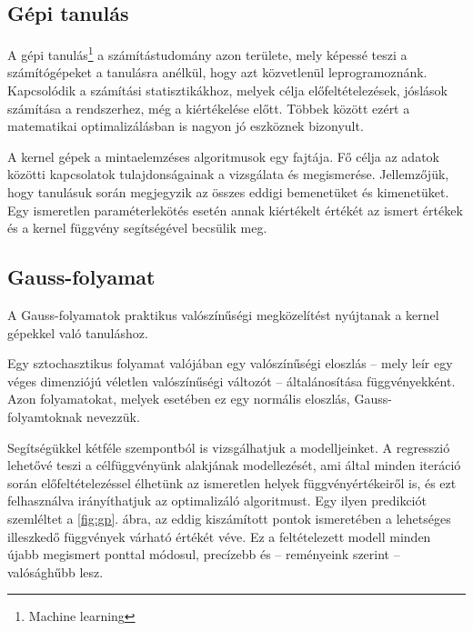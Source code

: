 \subsection{Gépi tanulás}

A gépi tanulás\footnote{Machine learning} a számítástudomány azon területe, mely képessé teszi a számítógépeket a tanulásra anélkül, hogy azt közvetlenül leprogramoznánk. Kapcsolódik a számítási statisztikákhoz, melyek célja előfeltételezések, jóslások számítása a rendszerhez, még a kiértékelése előtt. Többek között ezért a matematikai optimalizálásban is nagyon jó eszköznek bizonyult.

A kernel gépek a mintaelemzéses algoritmusok egy fajtája. Fő célja az adatok közötti kapcsolatok tulajdonságainak a vizsgálata és megismerése. Jellemzőjük, hogy tanulásuk során megjegyzik az összes eddigi bemenetüket és kimenetüket. Egy ismeretlen paraméterlekötés esetén annak kiértékelt értékét az ismert értékek és a kernel függvény segítségével becsülik meg.

\subsection{Gauss-folyamat}

A Gauss-folyamatok praktikus valószínűségi megközelítést nyújtanak a kernel gépekkel való tanuláshoz. 

Egy sztochasztikus folyamat valójában egy valószínűségi eloszlás -- mely leír egy véges dimenziójú véletlen valószínűségi változót -- általánosítása függvényekként. Azon folyamatokat, melyek esetében ez egy normális eloszlás, Gauss-folyamtoknak nevezzük.

Segítségükkel kétféle szempontból is vizsgálhatjuk a modelljeinket. A regresszió lehetővé teszi a célfüggvényünk alakjának modellezését, ami által minden iteráció során előfeltételezéssel élhetünk az ismeretlen helyek függvényértékeiről is, és ezt felhasználva irányíthatjuk az optimalizáló algoritmust. Egy ilyen predikciót szemléltet a \ref{fig:gp}. ábra, az eddig kiszámított pontok ismeretében a lehetséges illeszkedő függvények várható értékét véve. Ez a feltételezett modell minden újabb megismert ponttal módosul, precízebb és -- reményeink szerint -- valósághűbb lesz.

